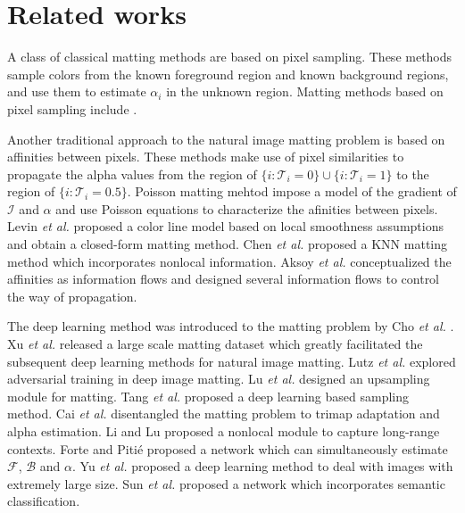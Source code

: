 \documentclass{article}
\theoremstyle{plain}
\begin{document}
\section{Related works}

A class of classical matting methods are based on pixel sampling.
These methods sample colors from the known foreground region and known background regions, and use them to estimate $\alpha_i$ in the unknown region.
Matting methods based on pixel sampling include
\cite{Chuang2001ABayesianApproach,Wang2007OptimizedColorSampling,Gastal2010SharedSampling,He2011AGlobalSampling,Shahrian2013ImprovingImageMatting,Feng2016AClusterSampling}.

Another traditional approach to the natural image matting problem is based on affinities between pixels.
These methods make use of pixel similarities to propagate the alpha values from the region of $\{i: \mathcal T_i = 0\} \cup \{i: \mathcal T_i = 1\}$ to the region of $\{i: \mathcal T_i = 0.5\}$.
Poisson matting mehtod \cite{Sun2004PoissonMatting} impose a model of the gradient of $\mathcal I$ and $\alpha$ and use Poisson equations to characterize the afinities between pixels.
Levin \emph{et al.} \cite{Levin2008AClosed-Form} proposed a color line model based on local smoothness assumptions and obtain a closed-form matting method.
Chen \emph{et al.} \cite{Chen2013KNNMatting} proposed a KNN matting method which incorporates nonlocal information.
Aksoy \emph{et al.} \cite{Aksoy2017DesigningEffective} conceptualized the affinities as information flows and designed several information flows to control the way of propagation.

The deep learning method was introduced to the matting problem by
Cho \emph{et al.} \cite{Cho2016NaturalImageMatting}. Xu \emph{et al.} \cite{Xu2017DeepImageMatting} released a large scale matting dataset which greatly facilitated the subsequent deep learning methods for natural image matting.
Lutz \emph{et al.} \cite{Lutz2018AlphaGAN} explored adversarial training in deep image matting.
Lu \emph{et al.} \cite{Lu2019IndicesMatter} designed an upsampling module for matting.
Tang \emph{et al.} \cite{Tang2019Learning-Based} proposed a deep learning based sampling method.
Cai \emph{et al.} \cite{Cai2019Disentangled} disentangled the matting problem to  trimap adaptation and alpha estimation.
Li and Lu \cite{Li2020NaturalImageMatting} proposed a nonlocal module to capture long-range contexts.
Forte and Piti\'e \cite{Forte2020FBA} proposed a network which can simultaneously estimate $\mathcal F$, $\mathcal B$ and $\alpha$.
Yu \emph{et al.} \cite{Yu2021High-ResolutionDeepImageMatting} proposed a deep learning method to deal with images with extremely large size.
Sun \emph{et al.} \cite{Sun2021SemanticImageMatting} proposed a network which incorporates semantic classification.
\end{document}
